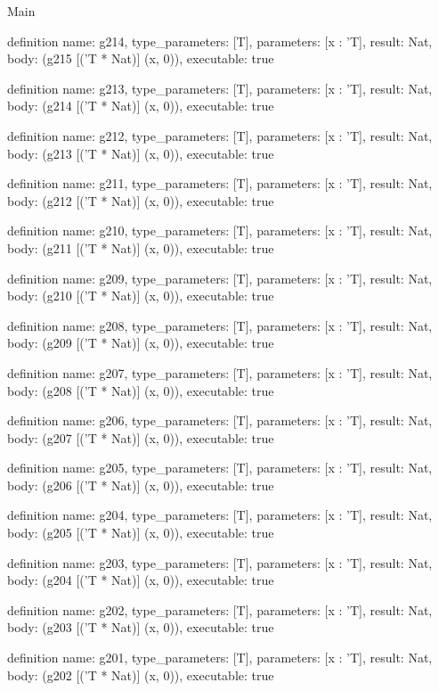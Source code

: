 \begin{lexlean}{Main}
\begin{semanticmodule}
definition{
  name: g214,
  type_parameters: [T],
  parameters: [x : 'T],
  result: Nat,
  body: (g215 [('T * Nat)] (x, 0)),
  executable: true
}

definition{
  name: g213,
  type_parameters: [T],
  parameters: [x : 'T],
  result: Nat,
  body: (g214 [('T * Nat)] (x, 0)),
  executable: true
}

definition{
  name: g212,
  type_parameters: [T],
  parameters: [x : 'T],
  result: Nat,
  body: (g213 [('T * Nat)] (x, 0)),
  executable: true
}

definition{
  name: g211,
  type_parameters: [T],
  parameters: [x : 'T],
  result: Nat,
  body: (g212 [('T * Nat)] (x, 0)),
  executable: true
}

definition{
  name: g210,
  type_parameters: [T],
  parameters: [x : 'T],
  result: Nat,
  body: (g211 [('T * Nat)] (x, 0)),
  executable: true
}

definition{
  name: g209,
  type_parameters: [T],
  parameters: [x : 'T],
  result: Nat,
  body: (g210 [('T * Nat)] (x, 0)),
  executable: true
}

definition{
  name: g208,
  type_parameters: [T],
  parameters: [x : 'T],
  result: Nat,
  body: (g209 [('T * Nat)] (x, 0)),
  executable: true
}

definition{
  name: g207,
  type_parameters: [T],
  parameters: [x : 'T],
  result: Nat,
  body: (g208 [('T * Nat)] (x, 0)),
  executable: true
}

definition{
  name: g206,
  type_parameters: [T],
  parameters: [x : 'T],
  result: Nat,
  body: (g207 [('T * Nat)] (x, 0)),
  executable: true
}

definition{
  name: g205,
  type_parameters: [T],
  parameters: [x : 'T],
  result: Nat,
  body: (g206 [('T * Nat)] (x, 0)),
  executable: true
}

definition{
  name: g204,
  type_parameters: [T],
  parameters: [x : 'T],
  result: Nat,
  body: (g205 [('T * Nat)] (x, 0)),
  executable: true
}

definition{
  name: g203,
  type_parameters: [T],
  parameters: [x : 'T],
  result: Nat,
  body: (g204 [('T * Nat)] (x, 0)),
  executable: true
}

definition{
  name: g202,
  type_parameters: [T],
  parameters: [x : 'T],
  result: Nat,
  body: (g203 [('T * Nat)] (x, 0)),
  executable: true
}

definition{
  name: g201,
  type_parameters: [T],
  parameters: [x : 'T],
  result: Nat,
  body: (g202 [('T * Nat)] (x, 0)),
  executable: true
}


\end{semanticmodule}
\end{lexlean}
